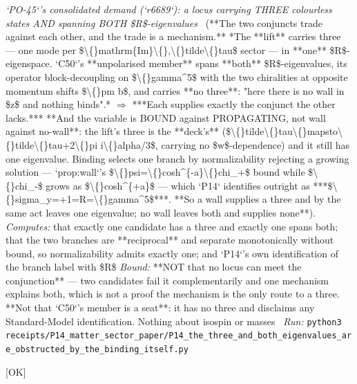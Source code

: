 \begin{description}
\textit{`PO-45`'s consolidated demand (`r6689`): a locus carrying THREE colourless states AND spanning BOTH \$R\$-eigenvalues} \ (**The two conjuncts trade against each other, and the trade is a mechanism.** *The **lift** carries three --- one mode per \$\textbackslash\{\}mathrm\{Im\}\textbackslash\{\},\textbackslash\{\}tilde\textbackslash\{\}tau\$ sector --- in **one** \$R\$-eigenspace. `C50`'s **unpolarised member** spans **both** \$R\$-eigenvalues, its operator block-decoupling on \$\textbackslash\{\}gamma\textasciicircum{}5\$ with the two chiralities at opposite momentum shifts \$\textbackslash\{\}pm b\$, and carries **no three**: "here there is no wall in \$z\$ and nothing binds".* \ensuremath{\Rightarrow} ***Each supplies exactly the conjunct the other lacks.***  **And the variable is BOUND against PROPAGATING, not wall against no-wall**: the lift's three is the **deck's** (\$\textbackslash\{\}tilde\textbackslash\{\}tau\textbackslash\{\}mapsto\textbackslash\{\}tilde\textbackslash\{\}tau+2\textbackslash\{\}pi i\textbackslash\{\}alpha/3\$, carrying no \$w\$-dependence) and it still has one eigenvalue. Binding selects one branch by normalizability rejecting a growing solution --- `prop:wall`'s \$\textbackslash\{\}psi=\textbackslash\{\}cosh\textasciicircum{}\{-a\}\textbackslash\{\}chi\_+\$ bound while \$\textbackslash\{\}chi\_-\$ grows as \$\textbackslash\{\}cosh\textasciicircum{}\{+a\}\$ --- which `P14` identifies outright as ***\$\textbackslash\{\}sigma\_y=+1=R=\textbackslash\{\}gamma\textasciicircum{}5\$***. **So a wall supplies a three and by the same act leaves one eigenvalue; no wall leaves both and supplies none**). 
\emph{Computes:} that exactly one candidate has a three and exactly one spans both; that the two branches are **reciprocal** and separate monotonically without bound, so normalizability admits exactly one; and `P14`'s own identification of the branch label with \$R\$
 \emph{Bound:}  **NOT that no locus can meet the conjunction** --- two candidates fail it complementarily and one mechanism explains both, which is not a proof the mechanism is the only route to a three. **Not that `C50`'s member is a seat**: it has no three and disclaims any Standard-Model identification. Nothing about isospin or masses
\ \emph{Run:} \texttt{python3 receipts/P14\_matter\_sector\_paper/P14\_the\_three\_and\_both\_eigenvalues\_are\_obstructed\_by\_the\_binding\_itself.py}
\item[\rcptlabel{P14_the_shared_four_sphere_carries_chirality_and_su2_and_cannot_carry_colour}{P14R84}\textbf{P14R84}\quad\texttt{P14\_the\_shared\_four\_sphere\_carries\_chirality\_and\_su2\_and\_cannot\_carry\_colour}]\hfill\textsf{[OK]}\\

\end{description}
